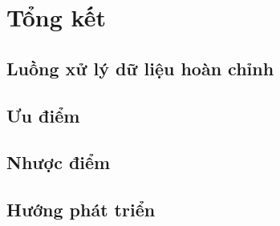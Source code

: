 \chapter{Tổng kết}
\section{Luồng xử lý dữ liệu hoàn chỉnh}
\section{Ưu điểm}
\section{Nhược điểm}
\section{Hướng phát triển}



